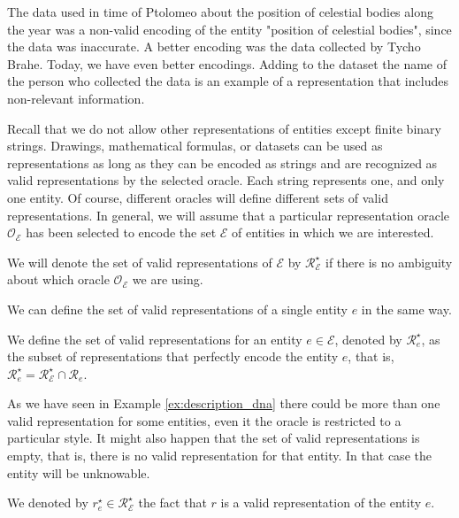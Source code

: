 \begin{example}
The data used in time of Ptolomeo about the position of celestial bodies along the year was a non-valid encoding of the entity "position of celestial bodies", since the data was inaccurate. A better encoding was the data collected by Tycho Brahe. Today, we have even better encodings. Adding to the dataset the name of the person who collected the data is an example of a representation that includes non-relevant information.
\end{example}

Recall that we do not allow other representations of entities except finite binary strings. Drawings, mathematical formulas, or datasets can be used as representations as long as they can be encoded as strings and are recognized as valid representations by the selected oracle. Each string represents one, and only one entity. Of course, different oracles will define different sets of valid representations. In general, we will assume that a particular representation oracle $\mathcal{O}_\mathcal{E}$ has been selected to encode the set $\mathcal{E}$ of entities in which we are interested.

\begin{notation}
We will denote the set of valid representations of $\mathcal{E}$ by $\mathcal{R}^\star_\mathcal{E}$ if there is no ambiguity about which oracle $\mathcal{O}_\mathcal{E}$ we are using.
\end{notation}

We can define the set of valid representations of a single entity $e$ in the same way.

\begin{definition}
We define the set of valid representations for an entity $e \in \mathcal{E}$, denoted by $\mathcal{R}^\star_e$, as the subset of representations that perfectly encode the entity $e$, that is, $\mathcal{R}^\star_e = \mathcal{R}^\star_\mathcal{E} \cap \mathcal{R}_e$.
\end{definition}

As we have seen in Example \ref{ex:description_dna} there could be more than one valid representation for some entities, even it the oracle is restricted to a particular style. It might also happen that the set of valid representations is empty, that is, there is no valid representation for that entity. In that case the entity will be unknowable.

\begin{notation}
We denoted by $r^\star_e \in \mathcal{R}^\star_\mathcal{E}$ the fact that $r$ is a valid representation of the entity $e$.
\end{notation}

